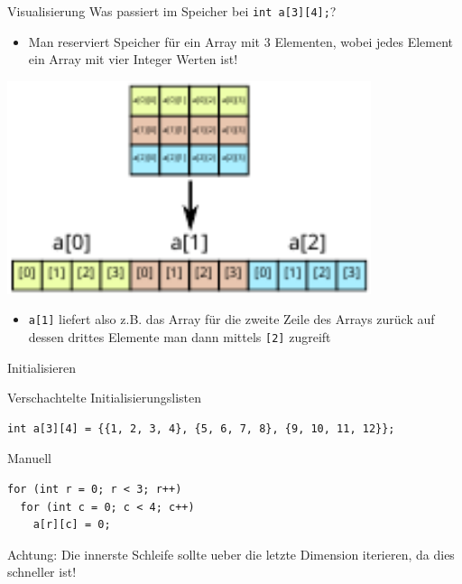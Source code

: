 \documentclass[presentation]{beamer}
\begin{document}
\begin{frame}[label={sec:org7877d90},fragile]{Visualisierung}
 Was passiert im Speicher bei {\color{solarizedYellow}\texttt{int a[3][4];}}?
\begin{itemize}
\item Man reserviert Speicher für ein \alert{Array mit 3 Elementen}, wobei
\alert{jedes Element ein Array mit vier Integer Werten} ist!
\end{itemize}
\begin{center}\begin{center}
\includegraphics[width=0.8\textwidth]{2dto1d.pdf}
\end{center}\end{center}
\begin{itemize}
\item {\color{solarizedYellow}\texttt{a[1]} }liefert also z.B. das Array für die zweite Zeile des Arrays
zurück auf dessen drittes Elemente man dann mittels {\color{solarizedYellow}\texttt{[2]} }zugreift
\end{itemize}
\end{frame}
\begin{frame}[label={sec:org47c32d7},fragile]{Initialisieren}
 \begin{block}{Verschachtelte Initialisierungslisten}
\begin{verbatim}
int a[3][4] = {{1, 2, 3, 4}, {5, 6, 7, 8}, {9, 10, 11, 12}};
\end{verbatim}
\end{block}
\begin{block}{Manuell}
\begin{verbatim}
for (int r = 0; r < 3; r++)
  for (int c = 0; c < 4; c++)
    a[r][c] = 0;
\end{verbatim}
Achtung: Die innerste Schleife sollte ueber die letzte Dimension
iterieren, da dies schneller ist!
\end{block}
\end{frame}
\end{document}
